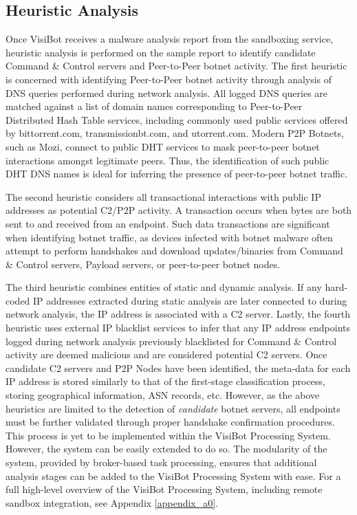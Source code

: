 \subsection{Heuristic Analysis}

Once VisiBot receives a malware analysis report from the sandboxing service, heuristic analysis is performed on the sample report to identify candidate Command \& Control servers and Peer-to-Peer botnet activity. The first heuristic is concerned with identifying Peer-to-Peer botnet activity through analysis of DNS queries performed during network analysis. All logged DNS queries are matched against a list of domain names corresponding to Peer-to-Peer Distributed Hash Table services, including commonly used public services offered by bittorrent.com, transmissionbt.com, and utorrent.com. Modern P2P Botnets, such as Mozi, connect to public DHT services to mask peer-to-peer botnet interactions amongst legitimate peers. Thus, the identification of such public DHT DNS names is ideal for inferring the presence of peer-to-peer botnet traffic. 

The second heuristic considers all transactional interactions with public IP addresses as potential C2/P2P activity. A transaction occurs when bytes are both sent to and received from an endpoint. Such data transactions are significant when identifying botnet traffic, as devices infected with botnet malware often attempt to perform handshakes and download updates/binaries from Command \& Control servers, Payload servers, or peer-to-peer botnet nodes.

The third heuristic combines entities of static and dynamic analysis. If any hard-coded IP addresses extracted during static analysis are later connected to during network analysis, the IP address is associated with a C2 server. Lastly, the fourth heuristic uses external IP blacklist services to infer that any IP address endpoints logged during network analysis previously blacklisted for Command \& Control activity are deemed malicious and are considered potential C2 servers. Once candidate C2 servers and P2P Nodes have been identified, the meta-data for each IP address is stored similarly to that of the first-stage classification process, storing geographical information, ASN records, etc. However, as the above heuristics are limited to the detection of \textit{candidate} botnet servers, all endpoints must be further validated through proper handshake confirmation procedures. This process is yet to be implemented within the VisiBot Processing System. However, the system can be easily extended to do so. The modularity of the system, provided by broker-based task processing, ensures that additional analysis stages can be added to the VisiBot Processing System with ease. For a full high-level overview of the VisiBot Processing System, including remote sandbox integration, see Appendix \ref{appendix_a0}.



